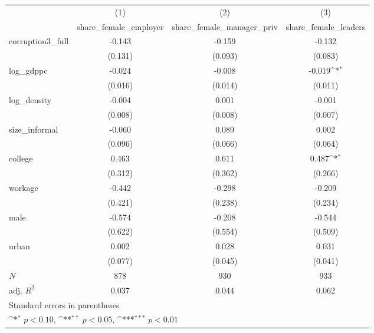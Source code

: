 {
\def\sym#1{\ifmmode^{#1}\else\(^{#1}\)\fi}
\begin{tabular}{l*{3}{c}}
\hline\hline
            &\multicolumn{1}{c}{(1)}&\multicolumn{1}{c}{(2)}&\multicolumn{1}{c}{(3)}\\
            &\multicolumn{1}{c}{share\_female\_employer}&\multicolumn{1}{c}{share\_female\_manager\_priv}&\multicolumn{1}{c}{share\_female\_leaders}\\
\hline
corruption3\_full&      -0.143         &      -0.159         &      -0.132         \\
            &     (0.131)         &     (0.093)         &     (0.083)         \\
[1em]
log\_gdppc   &      -0.024         &      -0.008         &      -0.019\sym{*}  \\
            &     (0.016)         &     (0.014)         &     (0.011)         \\
[1em]
log\_density &      -0.004         &       0.001         &      -0.001         \\
            &     (0.008)         &     (0.008)         &     (0.007)         \\
[1em]
size\_informal&      -0.060         &       0.089         &       0.002         \\
            &     (0.096)         &     (0.066)         &     (0.064)         \\
[1em]
college     &       0.463         &       0.611         &       0.487\sym{*}  \\
            &     (0.312)         &     (0.362)         &     (0.266)         \\
[1em]
workage     &      -0.442         &      -0.298         &      -0.209         \\
            &     (0.421)         &     (0.238)         &     (0.234)         \\
[1em]
male        &      -0.574         &      -0.208         &      -0.544         \\
            &     (0.622)         &     (0.554)         &     (0.509)         \\
[1em]
urban       &       0.002         &       0.028         &       0.031         \\
            &     (0.077)         &     (0.045)         &     (0.041)         \\
\hline
\(N\)       &         878         &         930         &         933         \\
adj. \(R^{2}\)&       0.037         &       0.044         &       0.062         \\
\hline\hline
\multicolumn{4}{l}{\footnotesize Standard errors in parentheses}\\
\multicolumn{4}{l}{\footnotesize \sym{*} \(p<0.10\), \sym{**} \(p<0.05\), \sym{***} \(p<0.01\)}\\
\end{tabular}
}

